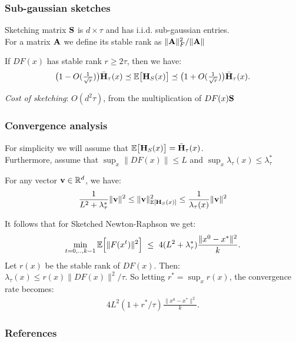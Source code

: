 \documentclass[10pt]{beamer}
\begin{document}
\begin{frame}
  \frametitle{Sub-gaussian sketches}
  Sketching matrix $\S$ is $d\times \tau$ and has i.i.d. sub-gaussian
  entries.\\
  For a matrix $\A$ we define its stable rank as $\|\A\|_F^2/\|\A\|$
  
  \begin{theorem}
    If $DF(x)$ has stable rank $r\ge 2\tau$, then we have:
    \begin{align*}
      \big(1-O(\tfrac1{\sqrt r})\big) \bar\H_\tau(x)
      \preceq \E\big[\H_S(x)\big] \preceq
      \big(1+O(\tfrac1{\sqrt r})\big) \bar\H_\tau(x).
    \end{align*} 
  \end{theorem}

  \emph{Cost of sketching}: $O(d^2\tau)$, from the multiplication of $DF(x)\S$
\end{frame}

\begin{frame}
  \frametitle{Convergence analysis}
  For simplicity we will assume that $\E\big[\H_S(x)\big]
  =\bar\H_\tau(x)$.\\
  Furthermore, assume that $\sup_x \|DF(x)\|\leq L$ and
  $\sup_x\lambda_\tau(x)\leq \lambda_\tau^*$
  \begin{lemma}
    For any vector $\v\in\R^d$, we have:
    \begin{align*}
    \frac1{L^2+\lambda_\tau^*}\|\v\|^2  \leq \|\v\|^2_{\E[\H_S(x)]}\leq \frac1{\lambda_\tau(x)}\|\v\|^2
    \end{align*}
  \end{lemma}
  It follows that for Sketched Newton-Raphson we get:
   \begin{align*}
    \min_{t=0,..,k-1}\E\Big[\|F(x^t)\|^2\Big]\ \leq\ 4(L^2+\lambda_\tau^*) \frac{\|x^0-x^*\|^2}{k}.
   \end{align*}
Let $r(x)$ be the stable rank of $DF(x)$. Then:
$\lambda_\tau(x)\leq r(x) \|DF(x)\|^2/\tau$.
So letting $r^*=\sup_x r(x)$, the convergence rate becomes:
   \begin{align*}
    4 L^2(1+ r^*/\tau)\frac{\|x^0-x^*\|^2}{k}.
   \end{align*}
 \end{frame}


\begin{frame}[allowframebreaks]
  \frametitle{References}
  \small
  
  
\end{frame}
\end{document}
